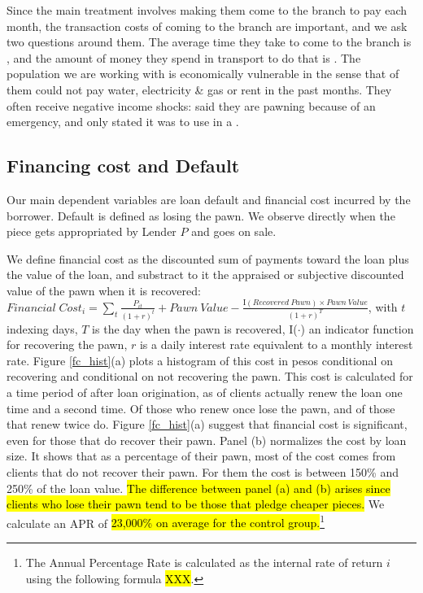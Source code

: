 \documentclass[11pt]{article}
\begin{document}
Since the main treatment involves making them come to the branch to pay each month, the transaction costs of coming to the branch are important, and we ask two questions around them. The average time they take to come to the branch is , and the amount of money they spend in transport to do that is  .  
The population we are working with is economically vulnerable in the sense that  of them could not pay  water, electricity \& gas or rent in the past  months. They often receive negative income shocks:  said they are pawning because of an emergency, and only  stated it was to use in a .

\subsection{Financing cost and Default} \label{FC_def}

Our main dependent variables are loan default and financial cost incurred by the borrower. Default is defined as losing the pawn. We observe directly when the piece gets appropriated by Lender $P$ and goes on sale. 

We define financial cost as the discounted sum of payments toward the loan plus the value of the loan, and substract to it the appraised or subjective discounted value of the pawn when it is recovered: $Financial \; Cost_i = \sum_t \frac{P_{it}}{(1+r)^t} + Pawn \: Value - \frac{\text{I}(Recovered \: Pawn) \times Pawn \: Value}{(1+r)^T}$, with $t$ indexing days, $T$ is the day when the pawn is recovered, I($\cdot$) an indicator function for recovering the pawn, $r$ is a daily interest rate equivalent to a  monthly interest rate. Figure \ref{fc_hist}(a) plots a histogram of this cost in pesos conditional on recovering and conditional on not recovering the pawn. This cost is calculated for a time period of  after loan origination, as  of clients actually renew the loan one time and  a second time. Of those who renew once  lose the pawn, and of those that renew twice  do. Figure \ref{fc_hist}(a) suggest that financial cost is significant, even for those that do recover their pawn.  Panel (b) normalizes the cost by loan size. It shows that as a percentage of their pawn, most of the cost comes from clients that do not recover their pawn. For them the cost is between 150\% and 250\% of the loan value. \hl{The difference between panel (a) and (b) arises since clients who lose their pawn tend to be those that pledge cheaper pieces.} We calculate an APR of \hl{23,000\% on average for the control group.}\footnote{The Annual Percentage Rate is calculated as the internal rate of return $i$ using the following formula \hl{XXX}.}
\end{document}
